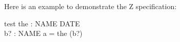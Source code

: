 \documentclass{llncs}
\begin{document}
Here is an example to demonstrate the Z specification:
\begin{schema}{test}
the : NAME \pfun DATE \\
b? : NAME
\where
a = the (b?)
\end{schema}
\end{document}
